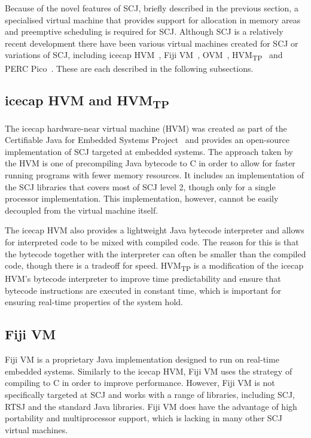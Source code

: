\documentclass[a4paper,10pt]{report}
\begin{document}

Because of the novel features of SCJ, briefly described in the
previous section, a specialised virtual machine that provides support
for allocation in memory areas and preemptive scheduling is required
for SCJ. Although SCJ is a relatively recent development there have
been various virtual machines created for SCJ or variations of SCJ,
including icecap HVM~\cite{sondergaard2012}, Fiji VM~\cite{pizlo2009},
OVM~\cite{armbruster2007}, HVM\textsubscript{TP}~\cite{luckow2014} and
PERC Pico~\cite{atego2015, richard2010}. These are each described in
the following subsections.

\subsection{icecap HVM and HVM\textsubscript{TP}}

The icecap hardware-near virtual machine (HVM) was created as part of the
Certifiable Java for Embedded Systems Project~\cite{schoeberl2014} and provides
an open-source implementation of SCJ targeted at embedded systems.  The
approach taken by the HVM is one of precompiling Java bytecode to C in order to
allow for faster running programs with fewer memory resources.  It includes an
implementation of the SCJ libraries that covers most of SCJ level 2, though only
for a single processor implementation.  This implementation, however, cannot be
easily decoupled from the virtual machine itself.

The icecap HVM also provides a lightweight Java bytecode interpreter and allows
for interpreted code to be mixed with compiled code.  The reason for this is
that the bytecode together with the interpreter can often be smaller than the
compiled code, though there is a tradeoff for speed. HVM\textsubscript{TP} is a
modification of the icecap HVM's bytecode interpreter to improve time
predictability and ensure that bytecode instructions are executed in constant
time, which is important for ensuring real-time properties of the system hold.

\subsection{Fiji VM}

Fiji VM is a proprietary Java implementation designed to run on real-time
embedded systems.  Similarly to the icecap HVM, Fiji VM uses the strategy of
compiling to C in order to improve performance.  However, Fiji VM is not
specifically targeted at SCJ and works with a range of libraries, including
SCJ, RTSJ and the standard Java libraries.  Fiji VM does have the advantage of
high portability and multiprocessor support, which is lacking in many other SCJ
virtual machines.
\end{document}
